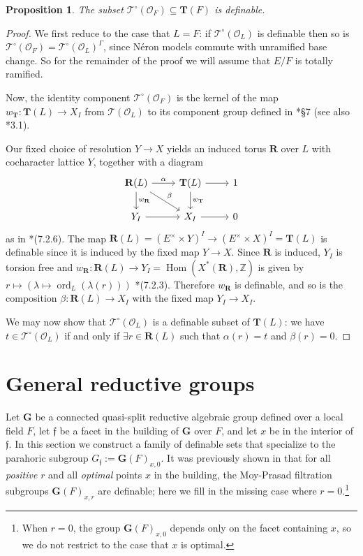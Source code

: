 \documentclass{amsart}
\newcommand{\Z}{{\mathbb Z}}
\newcommand{\ri}{\mathcal{O}}
\newcommand{\bG}{\mathbf{G}}
\newcommand{\bT}{\mathbf {T}}
\newcommand{\bR}{\mathbf{R}}
\newcommand{\ff}{{\mathfrak f}}
\newcommand{\Ner}[1]{\mathcal{#1}}
\newcommand{\NerC}[1]{\mathcal{#1}^\circ}
\DeclareMathOperator{\ord}{ord}
\DeclareMathOperator{\Hom}{Hom}
\theoremstyle{plain}
\newtheorem{prop}[thm]{Proposition}
\theoremstyle{definition}
\begin{document}
\begin{prop} \label{prop:NerCdefinable}
The subset $\NerC{T}(\ri_F) \subseteq \bT(F)$ is definable.
\end{prop}
\begin{proof}
We first reduce to the case that $L = F$: if $\NerC{T}(\ri_L)$ is definable then so is $\NerC{T}(\ri_F) = \NerC{T}(\ri_L)^\Gamma$, since N\'eron models commute with unramified base change.  So for the remainder of the proof we will assume that $E/F$ is totally ramified.

Now, the identity component $\NerC{T}(\ri_F)$ is the kernel of the map $w_\bT : \bT(L) \to X_I$ from $\Ner{T}(\ri_L)$ to its component group  defined in \cite{kottwitz:isocrystals-2}*{\S 7} (see also \cite{bitan}*{3.1}).

Our fixed choice of resolution $Y \to X$ yields an induced torus $\bR$ over $L$ with cocharacter lattice $Y$, together with a diagram
\[
\begin{tikzcd}
\bR(L) \rar{\alpha} \dar{w_{\bR}} \drar{\beta} & \bT(L) \rar \dar{w_{\bT}} & 1 \\
Y_I \rar & X_I \rar & 0
\end{tikzcd}
\]
as in \cite{kottwitz:isocrystals-2}*{(7.2.6)}.  The map $\bR(L) = (E^\times \times Y)^I \to (E^\times \times X)^I = \bT(L)$
is definable since it is induced by the fixed map $Y \to X$.  Since $\bR$ is induced,
$Y_I$ is torsion free and $w_\bR : \bR(L) \to Y_I = \Hom(X^\ast(\bR), \Z)$ is given by
$r \mapsto \left(\lambda \mapsto \ord_{L}(\lambda(r))\right)$ \cite{kottwitz:isocrystals-2}*{(7.2.3)}.
Therefore $w_\bR$ is definable, and so is the composition $\beta : \bR(L) \to X_I$ with the fixed map $Y_I \to X_I$.

We may now show that $\NerC{T}(\ri_L)$ is a definable subset of $\bT(L)$: we have $t \in \NerC{T}(\ri_L)$ if and only if $\exists r \in \bR(L)$ such that $\alpha(r) = t$ and $\beta(r) = 0$.
\end{proof}

\section{General reductive groups}
Let $\bG$ be a connected quasi-split reductive algebraic group defined over a local field $F$,
let $\ff$ be a facet in the building of $\bG$ over $F$, and let $x$ be in the interior of $\ff$. 
In this section we construct a family of definable sets that specialize to the parahoric subgroup ${G}_{\ff}:={\bG}(F)_{x, 0}$.
It was previously shown in \cite{CGH-2} that for all \emph{positive} $r$ and all \emph{optimal} points $x$ in the building, the Moy-Prasad filtration subgroups ${\bG}(F)_{x, r}$ are definable; here we fill in the missing case where $r=0$.\footnote{When $r=0$, the group ${\bG}(F)_{x,0}$ depends only on the facet containing $x$, so we do not restrict to the case that $x$ is optimal.}
\end{document}

